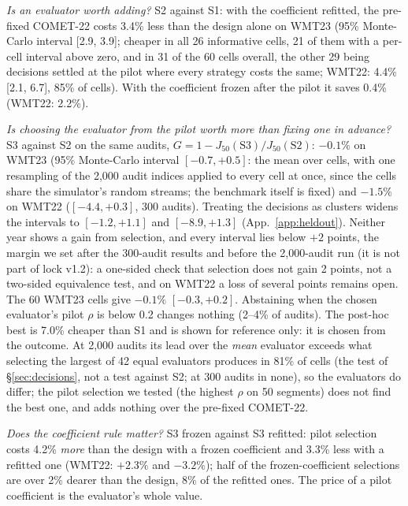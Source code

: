 \documentclass[11pt]{article}
\newcommand{\Jt}{J_{50}}
\begin{document}
\emph{Is an evaluator worth adding?} S2 against S1: with the coefficient refitted, the pre-fixed COMET-22 costs
3.4\% less than the design alone on WMT23 (95\% Monte-Carlo interval [2.9, 3.9]; cheaper in all 26 informative cells,
21 of them with a per-cell interval above zero, and in 31 of the 60 cells overall, the other 29 being decisions settled
at the pilot where every strategy costs the same; WMT22: 4.4\% [2.1, 6.7], 85\% of cells). With the coefficient frozen
after the pilot it saves 0.4\% (WMT22: 2.2\%).

\emph{Is choosing the evaluator from the pilot worth more than fixing one in advance?} S3 against S2 on the same
audits, $G=1-\Jt(\mathrm{S3})/\Jt(\mathrm{S2})$: $-0.1\%$ on WMT23 (95\% Monte-Carlo interval $[-0.7, +0.5]$: the
mean over cells, with one resampling of the 2,000 audit indices applied to every cell at once, since the cells share
the simulator's random streams; the benchmark itself is fixed) and $-1.5\%$ on WMT22 ($[-4.4, +0.3]$, 300 audits).
Treating the decisions as clusters widens the intervals to $[-1.2, +1.1]$ and $[-8.9, +1.3]$ (App.~\ref{app:heldout}).
Neither year shows a gain from selection, and every interval lies below $+2$ points, the margin we set after the
300-audit results and before the 2,000-audit run (it is not part of lock v1.2): a one-sided check that selection does
not gain 2 points, not a two-sided equivalence test, and on WMT22 a loss of several points remains open. The 60 WMT23
cells give $-0.1\%$ $[-0.3, +0.2]$. Abstaining when the chosen evaluator's pilot $\rho$ is below 0.2 changes nothing (2--4\% of audits).
The post-hoc best is 7.0\% cheaper than S1 and is shown for reference only: it is chosen from the outcome. At 2,000
audits its lead over the \emph{mean} evaluator exceeds what selecting the largest of 42 equal evaluators produces in
81\% of cells (the test of \S\ref{sec:decisions}, not a test against S2; at 300 audits in none), so the evaluators do
differ; the pilot selection we tested (the highest $\rho$ on 50 segments) does not find the best one, and adds
nothing over the pre-fixed COMET-22.

\emph{Does the coefficient rule matter?} S3 frozen against S3 refitted: pilot selection costs 4.2\% \emph{more}
than the design with a frozen coefficient and 3.3\% less with a refitted one (WMT22: $+2.3\%$ and $-3.2\%$); half of
the frozen-coefficient selections are over 2\% dearer than the design, 8\% of the refitted ones. The price of a pilot
coefficient is the evaluator's whole value.
\end{document}

